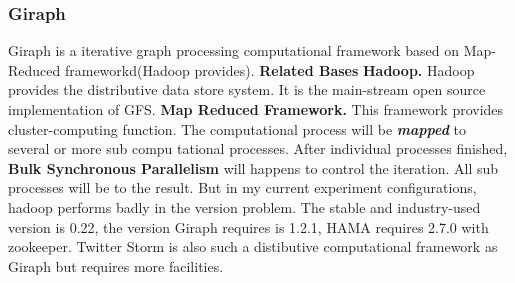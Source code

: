 \documentclass{article}
\begin{document}
	\subsubsection{Giraph}
	Giraph is a iterative graph processing computational framework based on Map-Reduced frameworkd(Hadoop provides).
	\textbf{Related Bases}\newline
	\textbf{Hadoop.} Hadoop provides the distributive data store system. It is the main-stream open source implementation of GFS\cite{ghemawat2003the}.\newline
	\textbf{Map Reduced Framework.}\cite{lammel2008google's} This framework provides cluster-computing function. The computational process will be \textbf{\emph{mapped}} to several or more sub compu tational processes. After individual processes finished, \textbf{Bulk Synchronous Parallelism}\cite{gerbessiotis1994direct} will happens to control the iteration. All sub processes will be  to the result.\newline
	But in my current experiment configurations, hadoop performs badly in the version problem. The stable and industry-used version is 0.22, the version Giraph requires is 1.2.1, HAMA\cite{seo2010hama:} requires 2.7.0 with zookeeper. Twitter Storm\cite{storm} is also such a distibutive computational framework as Giraph but requires more facilities.
\end{document}
